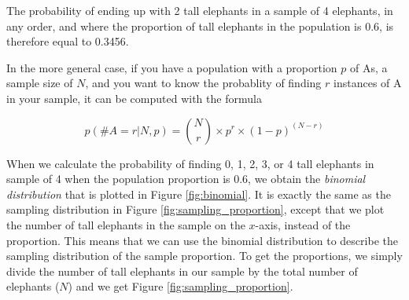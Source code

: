 The probability of ending up with 2 tall elephants in a sample of 4 elephants, in any order, and where the proportion of tall elephants in the population is 0.6, is therefore equal to 0.3456. 


In the more general case, if you have a population with a proportion $p$ of As, a sample size of $N$, and you want to know the probablity of finding $r$ instances of A in your sample, it can be computed with the formula


\begin{equation}
 p(\#A = r | N, p) = {N\choose r} \times p^r \times (1-p)^{(N-r)} 
\end{equation}

When we calculate the probability of finding 0, 1, 2, 3, or 4 tall elephants in sample of 4 when the population proportion is 0.6, we obtain the \textit{binomial distribution} that is plotted in Figure \ref{fig:binomial}. It is exactly the same as the sampling distribution in Figure \ref{fig:sampling_proportion}, except that we plot the number of tall elephants in the sample on the $x$-axis, instead of the proportion. This means that we can use the binomial distribution to describe the sampling distribution of the sample proportion. To get the proportions, we simply divide the number of tall elephants in our sample by the total number of elephants ($N$) and we get Figure \ref{fig:sampling_proportion}. 






\begin{kframe}


{\ttfamily\noindent\bfseries{}}

{\ttfamily\noindent\bfseries{}}

{\ttfamily\noindent\bfseries{}}

{\ttfamily\noindent\bfseries{}}

{\ttfamily\noindent\bfseries\color{errorcolor}{\#\# Error in cbind(strings, p\_strings): object 'strings' not found}}

{\ttfamily\noindent\bfseries{}}

{\ttfamily\noindent\bfseries{}}

{\ttfamily\noindent\bfseries{}}\end{kframe}


